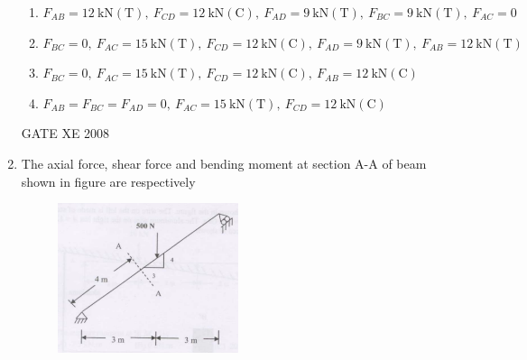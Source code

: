 \documentclass[12pt]{article}
\begin{document}
\begin{enumerate}[label=Q\arabic*.]
\begin{enumerate}[label=(\Alph*)]

    \item  $F_{AB} = 12\ \mathrm{kN}(\mathrm{T}),\ F_{CD} = 12\ \mathrm{kN}(\mathrm{C}),\ F_{AD} = 9\ \mathrm{kN}(\mathrm{T}),\ F_{BC} = 9\ \mathrm{kN}(\mathrm{T}),\ F_{AC} = 0$  

    \item  $F_{BC} = 0,\ F_{AC} = 15\ \mathrm{kN}(\mathrm{T}),\ F_{CD} = 12\ \mathrm{kN}(\mathrm{C}),\ F_{AD} = 9\ \mathrm{kN}(\mathrm{T}),\ F_{AB} = 12\ \mathrm{kN}(\mathrm{T})$  

    \item  $F_{BC} = 0,\ F_{AC} = 15\ \mathrm{kN}(\mathrm{T}),\ F_{CD} = 12\ \mathrm{kN}(\mathrm{C}),\ F_{AB} = 12\ \mathrm{kN}(\mathrm{C})$  

    \item  $F_{AB} = F_{BC} = F_{AD} = 0,\ F_{AC} = 15\ \mathrm{kN}(\mathrm{T}),\ F_{CD} = 12\ \mathrm{kN}(\mathrm{C})$
\end{enumerate}    
    
    GATE XE 2008  

    \item The axial force, shear force and bending moment at section A-A of beam shown in figure are respectively  

    \begin{figure}[H]
    \centering
    \includegraphics[width=0.5\textwidth]{figs/ass1_f_q25.png}
    \caption{}
    \end{figure}

\begin{enumerate}[label=(\Alph*)]
\end{enumerate}
    

\end{enumerate}
\end{document}
